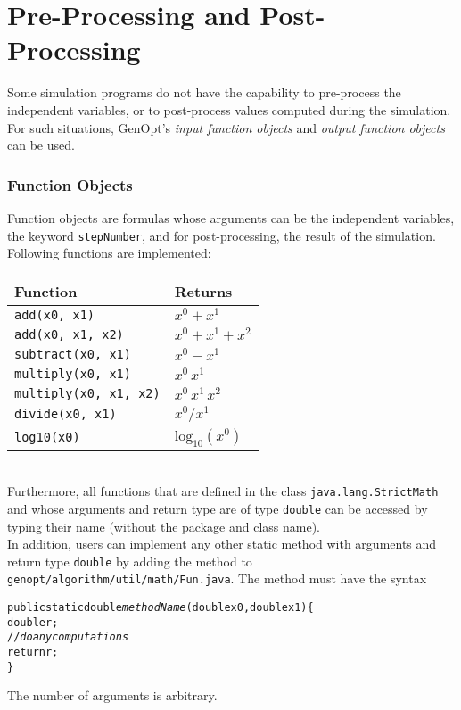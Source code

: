 \section{Pre-Processing and Post-Processing}
\label{par:posPro}
Some simulation programs do not have the capability to pre-process the independent variables,
or to post-process values computed during the simulation.
For such situations, GenOpt's {\it input function objects} and {\it output function objects} can be used.

\subsubsection{Function Objects}
Function objects are formulas whose arguments can be the independent variables,
the keyword {\tt stepNumber}, and for post-processing,
the result of the simulation.\\

Following functions are implemented:\\[\baselineskip]
\noindent
\begin{tabular}[h]{l|l}
Function & Returns \\ \hline
\texttt{add(x0, x1)} & $x^0 + x^1$\\
\texttt{add(x0, x1, x2)} & $x^0 + x^1 + x^2$ \\
\texttt{subtract(x0, x1)} & $x^0 - x^1$\\
\texttt{multiply(x0, x1)} & $x^0 \, x^1$ \\
\texttt{multiply(x0, x1, x2)} & $x^0 \, x^1 \, x^2$\\
\texttt{divide(x0, x1)}                & $x^0 / x^1$  \\
\texttt{log10(x0)}                     & $\mathrm{log}_{10}(x^0)$
\end{tabular}\\[\baselineskip]
Furthermore, all functions that are defined in the class \texttt{java.lang.StrictMath} and whose arguments and return type are of type \texttt{double} can be accessed by typing their name (without the package and class name).\\

In addition, users can implement any other static method with arguments 
and return type \texttt{double} by adding the method to 
\texttt{genopt/algorithm/util/math/Fun.java}. 
The method must have the syntax
\begin{alltt}
  public static double {\it methodName}(double x0, double x1) \{
    double r;
    // {\it do any computations }
    return r; 
  \}
\end{alltt}
The number of arguments is arbitrary.

